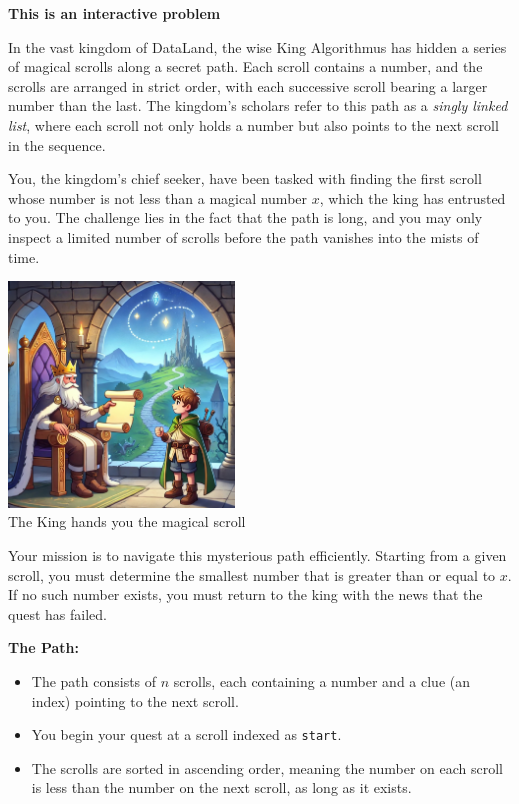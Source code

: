\textbf{This is an interactive problem}

In the vast kingdom of DataLand, the wise King Algorithmus has hidden a series of magical scrolls along a secret path. Each scroll contains a number, and the scrolls are arranged in strict order, with each successive scroll bearing a larger number than the last. The kingdom's scholars refer to this path as a \textit{singly linked list}, where each scroll not only holds a number but also points to the next scroll in the sequence.

You, the kingdom's chief seeker, have been tasked with finding the first scroll whose number is not less than a magical number $x$, which the king has entrusted to you. The challenge lies in the fact that the path is long, and you may only inspect a limited number of scrolls before the path vanishes into the mists of time.

\begin{center}
  \def \htmlPixelsInCm {45}  %
  \includegraphics[width=6cm]{scroll.jpg} \\
  \small{The King hands you the magical scroll}
\end{center}

Your mission is to navigate this mysterious path efficiently. Starting from a given scroll, you must determine the smallest number that is greater than or equal to $x$. If no such number exists, you must return to the king with the news that the quest has failed.

\textbf{The Path:}
\begin{itemize}
    \item The path consists of $n$ scrolls, each containing a number and a clue (an index) pointing to the next scroll.
    \item You begin your quest at a scroll indexed as \texttt{start}.
    \item The scrolls are sorted in ascending order, meaning the number on each scroll is less than the number on the next scroll, as long as it exists.
\end{itemize}


